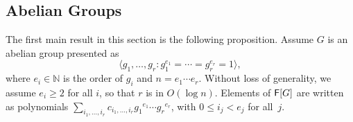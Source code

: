 
\subsection{Abelian Groups}
\label{ssec:proj_abelian}

The first main result in this section is the following proposition.
Assume $G$ is an abelian group presented as 
\[ \label{eq:abeliangrp}
  \langle g_1, \ldots , g_r: g_{1}^{e_1} = \cdots = g_{r}^{e_r} = 1
  \rangle,
\]
where $ e_i \in \mathbb{N}$ is the order of $g_i$ and $n = e_1 \cdots
e_r$.  Without loss of generality, we assume $e_i \ge 2$ for all $i$,
so that $r$ is in $O(\log n)$. Elements of ${\mathsf{F}}[G]$ are written as
polynomials $\sum_{i_1,\dots,i_r} c_{i_1,\dots,i_r}
{g_1}^{e_1} \cdots {g_r}^{e_r}$, with $0\le i_j < e_j$ for all~$j$.



